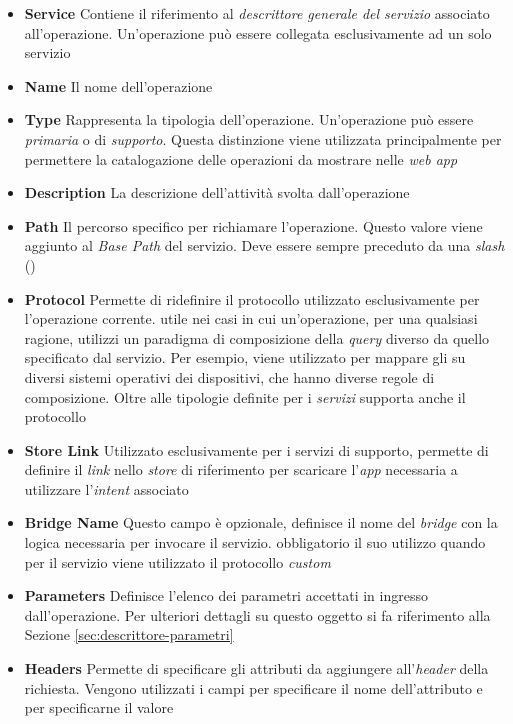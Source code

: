 \begin{itemize}
	\item \textbf{Service}
	Contiene il riferimento al \emph{descrittore generale del servizio} associato all'operazione. Un'operazione può essere collegata esclusivamente ad un solo servizio
	\item \textbf{Name}
	Il nome dell'operazione
	\item \textbf{Type}
	Rappresenta la tipologia dell'operazione. Un'operazione può essere \emph{primaria} o di \emph{supporto}. Questa distinzione viene utilizzata principalmente per permettere la catalogazione delle operazioni da mostrare nelle \emph{web app}
	\item \textbf{Description}
	La descrizione dell'attività svolta dall'operazione
	\item \textbf{Path}
	Il percorso specifico per richiamare l'operazione. Questo valore viene aggiunto al \emph{Base Path} del servizio. Deve essere sempre preceduto da una \emph{slash} (\virgolette{/})
	\item \textbf{Protocol}
	Permette di ridefinire il protocollo utilizzato esclusivamente per l'operazione corrente. \upe utile nei casi in cui un'operazione, per una qualsiasi ragione, utilizzi un paradigma di composizione della \emph{query} diverso da quello specificato dal servizio. Per esempio, viene utilizzato per mappare gli  su diversi sistemi operativi dei dispositivi, che hanno diverse regole di composizione. Oltre alle tipologie definite per i \emph{servizi} supporta anche il protocollo 
	\item \textbf{Store Link}
	Utilizzato esclusivamente per i servizi di supporto, permette di definire il \emph{link} nello \emph{store} di riferimento per scaricare l'\emph{app} necessaria a utilizzare l'\emph{intent} associato
	\item \textbf{Bridge Name}
	Questo campo è opzionale, definisce il nome del \emph{bridge} con la logica necessaria per invocare il servizio. \upe obbligatorio il suo utilizzo quando per il servizio viene utilizzato il protocollo \emph{custom}
	\item \textbf{Parameters}
	Definisce l'elenco dei parametri accettati in ingresso dall'o\-pe\-ra\-zio\-ne. Per ulteriori dettagli su questo oggetto si fa riferimento alla Sezione \ref{sec:descrittore-parametri}
	\item \textbf{Headers}
	Permette di specificare gli attributi da aggiungere all'\emph{header} della richiesta. Vengono utilizzati i campi  per specificare il nome dell'at\-tri\-bu\-to e  per specificarne il valore

\end{itemize}
